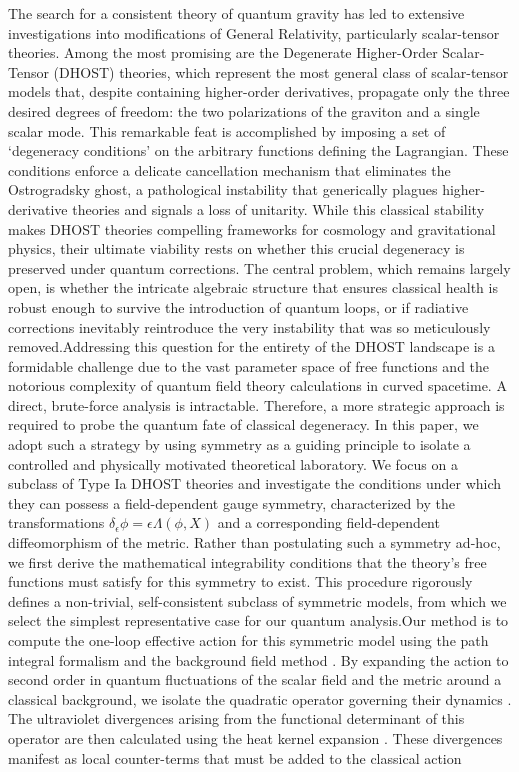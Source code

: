 \documentclass[twocolumn]{aastex631}
\begin{document}
The search for a consistent theory of quantum gravity has led to extensive investigations into modifications of General Relativity, particularly scalar-tensor theories. Among the most promising are the Degenerate Higher-Order Scalar-Tensor (DHOST) theories, which represent the most general class of scalar-tensor models that, despite containing higher-order derivatives, propagate only the three desired degrees of freedom: the two polarizations of the graviton and a single scalar mode. This remarkable feat is accomplished by imposing a set of `degeneracy conditions' on the arbitrary functions defining the Lagrangian. These conditions enforce a delicate cancellation mechanism that eliminates the Ostrogradsky ghost, a pathological instability that generically plagues higher-derivative theories and signals a loss of unitarity. While this classical stability makes DHOST theories compelling frameworks for cosmology and gravitational physics, their ultimate viability rests on whether this crucial degeneracy is preserved under quantum corrections. The central problem, which remains largely open, is whether the intricate algebraic structure that ensures classical health is robust enough to survive the introduction of quantum loops, or if radiative corrections inevitably reintroduce the very instability that was so meticulously removed.Addressing this question for the entirety of the DHOST landscape is a formidable challenge due to the vast parameter space of free functions and the notorious complexity of quantum field theory calculations in curved spacetime. A direct, brute-force analysis is intractable. Therefore, a more strategic approach is required to probe the quantum fate of classical degeneracy. In this paper, we adopt such a strategy by using symmetry as a guiding principle to isolate a controlled and physically motivated theoretical laboratory. We focus on a subclass of Type Ia DHOST theories and investigate the conditions under which they can possess a field-dependent gauge symmetry, characterized by the transformations $\delta_\epsilon \phi = \epsilon \Lambda(\phi, X)$ and a corresponding field-dependent diffeomorphism of the metric. Rather than postulating such a symmetry ad-hoc, we first derive the mathematical integrability conditions that the theory's free functions must satisfy for this symmetry to exist. This procedure rigorously defines a non-trivial, self-consistent subclass of symmetric models, from which we select the simplest representative case for our quantum analysis.Our method is to compute the one-loop effective action for this symmetric model using the path integral formalism and the background field method \citep{ferrero2025oneloopeffectiveactioncoherent,ferrero2025oneloopeffectiveactioncoherent}. By expanding the action to second order in quantum fluctuations of the scalar field and the metric around a classical background, we isolate the quadratic operator governing their dynamics \citep{ferrero2025oneloopeffectiveactioncoherent}. The ultraviolet divergences arising from the functional determinant of this operator are then calculated using the heat kernel expansion \citep{branchina2024pathintegralmeasurecosmological,ferrero2025oneloopeffectiveactioncoherent}. These divergences manifest as local counter-terms that must be added to the classical action 
\end{document}

